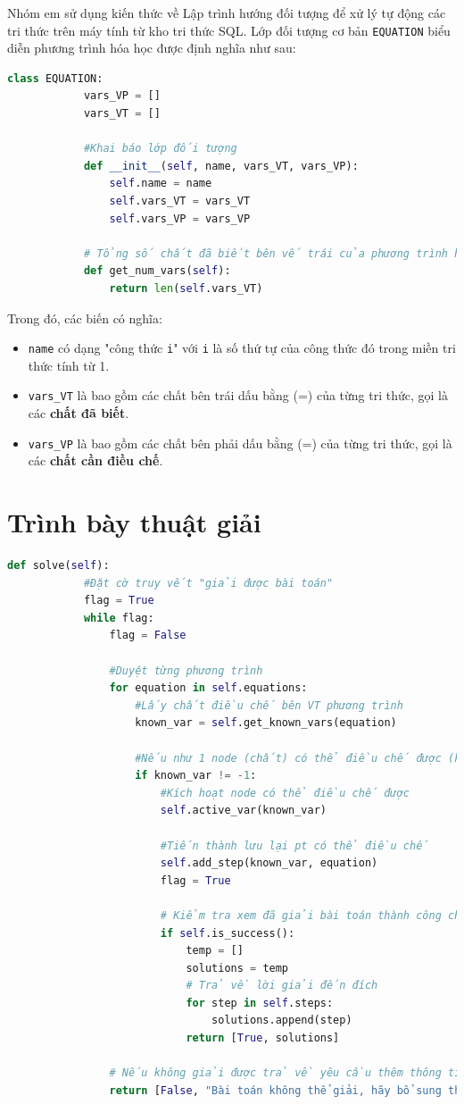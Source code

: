 \documentclass[a4paper]{article}
\begin{document}
	Nhóm em sử dụng kiến thức về Lập trình hướng đối tượng để xử lý tự động các tri thức trên máy tính từ kho tri thức SQL. Lớp đối tượng cơ bản \texttt{EQUATION} biểu diễn phương trình hóa học được định nghĩa như sau:
	\begin{lstlisting}[language=Python, caption=Lớp đối tượng \texttt{EQUATION}]
		class EQUATION:
			vars_VP = []
			vars_VT = []
			
			#Khai báo lớp đối tượng
			def __init__(self, name, vars_VT, vars_VP):
				self.name = name
				self.vars_VT = vars_VT
				self.vars_VP = vars_VP
			
			# Tổng số chất đã biết bên vế trái của phương trình hóa học
			def get_num_vars(self):
				return len(self.vars_VT)
	\end{lstlisting}
	Trong đó, các biến có nghĩa:
	\begin{itemize}
		\item \texttt{name} có dạng "công thức \texttt{i}" với \texttt{i} là số thứ tự của công thức đó trong miền tri thức tính từ 1.
		\item \texttt{vars\_VT} là bao gồm các chất bên trái dấu bằng (=) của từng tri thức, gọi là các \textbf{chất đã biết}.
		\item \texttt{vars\_VP} là bao gồm các chất bên phải dấu bằng (=) của từng tri thức, gọi là các \textbf{chất cần điều chế}.
	\end{itemize}
	
	\section{Trình bày thuật giải}
	\begin{lstlisting}[language=Python, caption=Thuật giải mạng ngữ nghĩa điều chế]
		def solve(self):
			#Đặt cờ truy vết "giải được bài toán"
			flag = True
			while flag:
				flag = False
					
				#Duyệt từng phương trình
				for equation in self.equations:
					#Lấy chất điều chế bên VT phương trình
					known_var = self.get_known_vars(equation)
					
					#Nếu như 1 node (chất) có thể điều chế được (khác -1)
					if known_var != -1:
						#Kích hoạt node có thể điều chế được
						self.active_var(known_var)
						
						#Tiến thành lưu lại pt có thể điều chế
						self.add_step(known_var, equation)
						flag = True
						
						# Kiểm tra xem đã giải bài toán thành công chưa?
						if self.is_success():
							temp = []
							solutions = temp
							# Trả về lời giải đến đích
							for step in self.steps:
								solutions.append(step)
							return [True, solutions]
						
				# Nếu không giải được trả về yêu cầu thêm thông tin, tri thức
				return [False, "Bài toán không thể giải, hãy bổ sung thêm thông tin hoặc tri thức."]
	\end{lstlisting}
	
\end{document}

